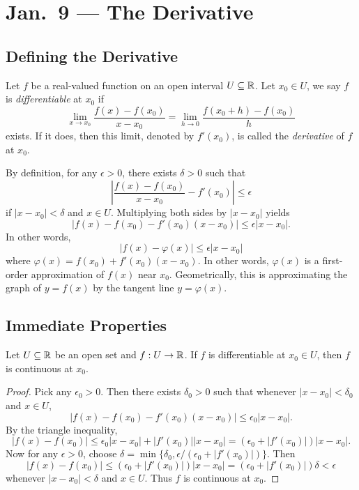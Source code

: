 \chapter{Jan.~9 --- The Derivative}

\section{Defining the Derivative}
\begin{definition}
  Let $f$ be a real-valued function on an open interval
  $U \subseteq \mathbb{R}$. Let $x_0 \in U$, we say $f$ is
  \emph{differentiable} at $x_0$ if
  \[
    \lim_{x \to x_0} \frac{f(x) - f(x_0)}{x - x_0}
    = \lim_{h \to 0} \frac{f(x_0 + h) - f(x_0)}{h}
  \]
  exists. If it does, then this limit, denoted by
  $f'(x_0)$, is called the \emph{derivative} of $f$ at
  $x_0$.
\end{definition}

\begin{remark}
By definition, for any $\epsilon > 0$, there exists
$\delta > 0$ such that
\[
  \left|\frac{f(x) - f(x_0)}{x - x_0} - f'(x_0)\right| \le \epsilon
\]
if $|x - x_0| < \delta$ and $x \in U$. Multiplying
both sides by $|x - x_0|$ yields
\[
  |f(x) - f(x_0) - f'(x_0)(x - x_0)| \le \epsilon |x - x_0|.
\]
In other words,
\[|f(x) - \varphi(x)| \le \epsilon |x - x_0|\]
where $\varphi(x) = f(x_0) + f'(x_0)(x - x_0)$.
In other words, $\varphi(x)$ is a first-order
approximation of $f(x)$ near $x_0$.
Geometrically, this is approximating the graph of
$y = f(x)$ by the tangent line $y = \varphi(x)$.
\end{remark}

\section{Immediate Properties}
\begin{prop}
  Let $U \subseteq \mathbb{R}$ be an open set and $ f : U \to \mathbb{R}$.
  If $f$ is differentiable at $x_0 \in U$, then
  $f$ is continuous at $x_0$.
\end{prop}

\begin{proof}
  Pick any $\epsilon_0 > 0$. Then there exists
  $\delta_0 > 0$ such that whenever
  $|x - x_0| < \delta_0$ and $x \in U$,
  \[|f(x) - f(x_0) - f'(x_0)(x - x_0)| \le \epsilon_0 |x - x_0|.\]
  By the triangle inequality,
  \[
    |f(x) - f(x_0)| \le \epsilon_0 |x - x_0| + |f'(x_0)| |x - x_0| = (\epsilon_0 + |f'(x_0)|) |x - x_0|.
  \]
  Now for any $\epsilon > 0$, choose
  $\delta = \min\{\delta_0, \epsilon / (\epsilon_0 + |f'(x_0)|)\}$.
  Then
  \[
    |f(x) - f(x_0)| \le (\epsilon_0 + |f'(x_0)|) |x - x_0| = (\epsilon_0 + |f'(x_0)|) \delta < \epsilon
  \]
  whenever $|x - x_0| < \delta$ and $x \in U$.
  Thus $f$ is continuous at $x_0$.
\end{proof}

